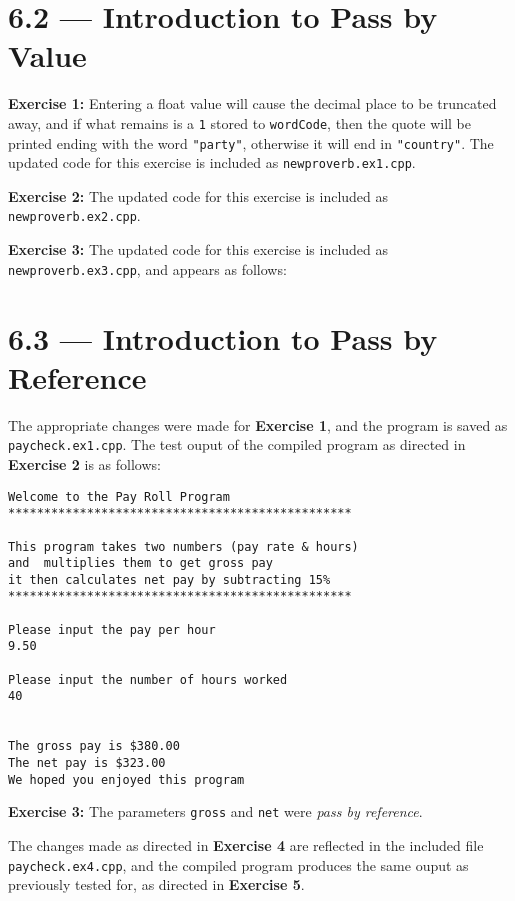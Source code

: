 \documentclass[11pt]{article}
\begin{document}
\newpage
\section*{6.2 --- Introduction to Pass by Value}

	\textbf{Exercise 1:} Entering a float value will cause the decimal place to be truncated away, and if what remains is a \texttt{1} stored to \texttt{wordCode}, then the quote will be printed ending with the word \texttt{"party"}, otherwise it will end in \texttt{"country"}. The updated code for this exercise is included as \texttt{newproverb.ex1.cpp}.
	
	\textbf{Exercise 2:} The updated code for this exercise is included as \texttt{newproverb.ex2.cpp}.
	
	\textbf{Exercise 3:} The updated code for this exercise is included as \texttt{newproverb.ex3.cpp}, and appears as follows: 


\newpage
\section*{6.3 --- Introduction to Pass by Reference}

	The appropriate changes were made for \textbf{Exercise 1}, and the program is saved as \texttt{paycheck.ex1.cpp}. The test ouput of the compiled program as directed in \textbf{Exercise 2} is as follows: \begin{verbatim}
Welcome to the Pay Roll Program
************************************************

This program takes two numbers (pay rate & hours)
and  multiplies them to get gross pay 
it then calculates net pay by subtracting 15%
************************************************

Please input the pay per hour
9.50

Please input the number of hours worked
40


The gross pay is $380.00
The net pay is $323.00
We hoped you enjoyed this program
\end{verbatim}

	\textbf{Exercise 3:} The parameters \lstinline{gross} and \lstinline{net} were \emph{pass by reference}.
	
	The changes made as directed in \textbf{Exercise 4} are reflected in the included file \texttt{paycheck.ex4.cpp}, and the compiled program produces the same ouput as previously tested for, as directed in \textbf{Exercise 5}.
\end{document}
